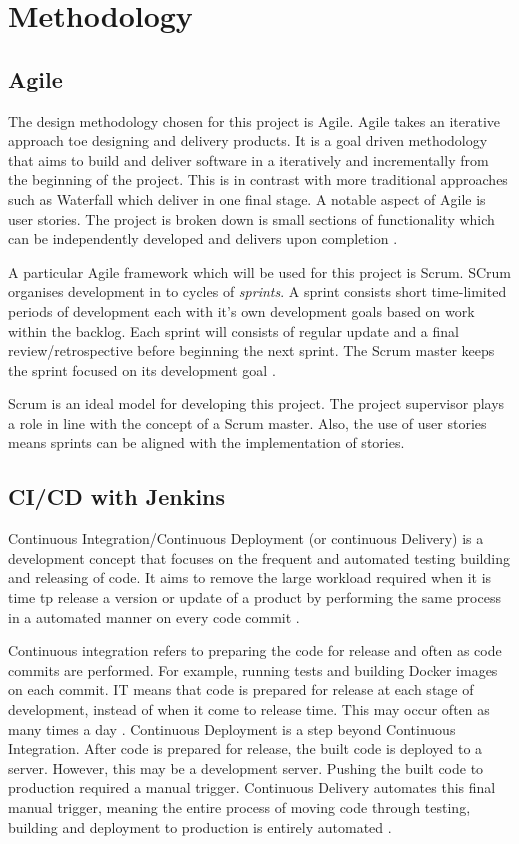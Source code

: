 \section{Methodology}
	\subsection{Agile}
	The design methodology chosen for this project is Agile. Agile takes an iterative approach toe designing and delivery products. It is a goal driven methodology that aims to build and deliver software in a iteratively and incrementally from the beginning of the project. This is in contrast with more traditional approaches such as Waterfall which deliver in one final stage. A notable aspect of Agile is user stories. The project is broken down is small sections of functionality which can be independently developed and delivers upon completion \citep{rasmusson}. 
	
	A particular Agile framework which will be used for this project is Scrum. SCrum organises development in to cycles of \textit{sprints}. A sprint consists short time-limited periods of development each with it's own development goals based on work within  the backlog. Each sprint will consists of regular update and a final review/retrospective before beginning the next sprint. The Scrum master keeps the sprint focused on its development goal \citep{scrum}.
	
	Scrum is an ideal model for developing this project. The project supervisor plays a role in line with the concept of a Scrum master. Also, the use of user stories means sprints can be aligned with the implementation of stories.
	
	\subsection{CI/CD with Jenkins}
	Continuous Integration/Continuous Deployment (or continuous Delivery) is a development concept that focuses on the frequent and automated testing building and releasing of code. It aims to remove the large workload required when it is time tp release a version or update of a product by performing the same process in a automated manner on every code commit \citep{pittet}.
	
	Continuous integration refers to preparing the code for release and often as code commits are performed. For example, running tests and building Docker images on each commit. IT means that code is prepared for release at each stage of development, instead of when it come to release time. This may occur often as many times a day \citep{ramos}.
	Continuous Deployment is a step beyond Continuous Integration. After code is prepared for release, the built code is deployed to a server. However, this may be a development server. Pushing the built code to production required a manual trigger. Continuous Delivery automates this final manual trigger, meaning the entire process of moving code through testing, building and deployment to production is entirely automated \citep{ellingwood}.
	
